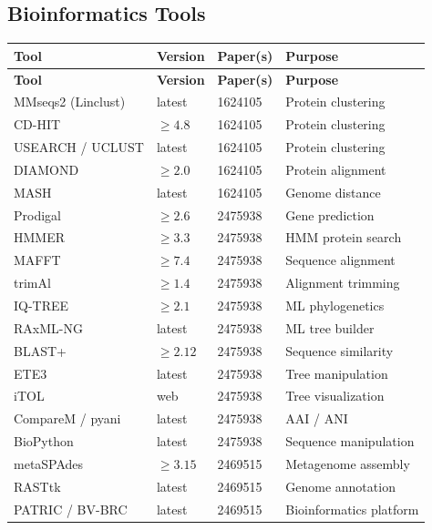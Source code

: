 \documentclass[11pt,a4paper]{article}
\begin{document}
\subsection{Bioinformatics Tools}

\begin{longtable}{p{3.5cm} p{2cm} p{3cm} p{5cm}}
\toprule
\textbf{Tool} & \textbf{Version} & \textbf{Paper(s)} & \textbf{Purpose} \\
\midrule
\endfirsthead
\toprule
\textbf{Tool} & \textbf{Version} & \textbf{Paper(s)} & \textbf{Purpose} \\
\midrule
\endhead
MMseqs2 (Linclust) & latest & 1624105 & Protein clustering \\
\midrule
CD-HIT & $\geq 4.8$ & 1624105 & Protein clustering \\
\midrule
USEARCH / UCLUST & latest & 1624105 & Protein clustering \\
\midrule
DIAMOND & $\geq 2.0$ & 1624105 & Protein alignment \\
\midrule
MASH & latest & 1624105 & Genome distance \\
\midrule
Prodigal & $\geq 2.6$ & 2475938 & Gene prediction \\
\midrule
HMMER & $\geq 3.3$ & 2475938 & HMM protein search \\
\midrule
MAFFT & $\geq 7.4$ & 2475938 & Sequence alignment \\
\midrule
trimAl & $\geq 1.4$ & 2475938 & Alignment trimming \\
\midrule
IQ-TREE & $\geq 2.1$ & 2475938 & ML phylogenetics \\
\midrule
RAxML-NG & latest & 2475938 & ML tree builder \\
\midrule
BLAST+ & $\geq 2.12$ & 2475938 & Sequence similarity \\
\midrule
ETE3 & latest & 2475938 & Tree manipulation \\
\midrule
iTOL & web & 2475938 & Tree visualization \\
\midrule
CompareM / pyani & latest & 2475938 & AAI / ANI \\
\midrule
BioPython & latest & 2475938 & Sequence manipulation \\
\midrule
metaSPAdes & $\geq 3.15$ & 2469515 & Metagenome assembly \\
\midrule
RASTtk & latest & 2469515 & Genome annotation \\
\midrule
PATRIC / BV-BRC & latest & 2469515 & Bioinformatics platform \\

\end{longtable}
\end{document}
